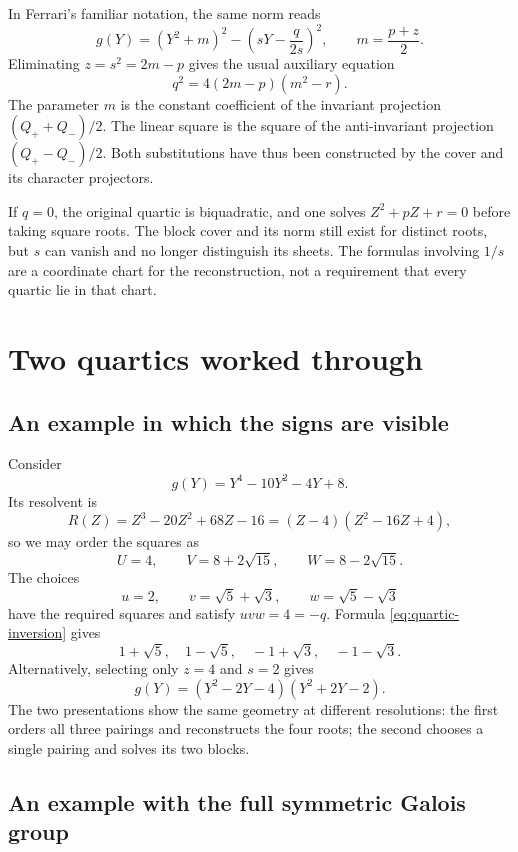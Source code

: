 \documentclass[11pt]{article}
\theoremstyle{remark}
\begin{document}
In Ferrari's familiar notation, the same norm reads
\begin{equation}
g(Y)=(Y^2+m)^2-\left(sY-\frac{q}{2s}\right)^2,
\qquad m=\frac{p+z}{2}.
\label{eq:ferrari-square}
\end{equation}
Eliminating \(z=s^2=2m-p\) gives the usual auxiliary equation
\[
q^2=4(2m-p)(m^2-r).
\]
The parameter \(m\) is the constant coefficient of the invariant projection \((Q_++Q_-)/2\). The linear square is the square of the anti-invariant projection \((Q_+-Q_-)/2\). Both substitutions have thus been constructed by the cover and its character projectors.

If \(q=0\), the original quartic is biquadratic, and one solves \(Z^2+pZ+r=0\) before taking square roots. The block cover and its norm still exist for distinct roots, but \(s\) can vanish and no longer distinguish its sheets. The formulas involving \(1/s\) are a coordinate chart for the reconstruction, not a requirement that every quartic lie in that chart.

\section{Two quartics worked through}

\subsection{An example in which the signs are visible}

Consider
\[
g(Y)=Y^4-10Y^2-4Y+8.
\]
Its resolvent is
\[
R(Z)=Z^3-20Z^2+68Z-16=(Z-4)(Z^2-16Z+4),
\]
so we may order the squares as
\[
U=4,\qquad V=8+2\sqrt{15},\qquad W=8-2\sqrt{15}.
\]
The choices
\[
u=2,\qquad v=\sqrt5+\sqrt3,\qquad w=\sqrt5-\sqrt3
\]
have the required squares and satisfy \(uvw=4=-q\). Formula \eqref{eq:quartic-inversion} gives
\[
1+\sqrt5,\quad 1-\sqrt5,\quad -1+\sqrt3,\quad -1-\sqrt3.
\]
Alternatively, selecting only \(z=4\) and \(s=2\) gives
\[
g(Y)=(Y^2-2Y-4)(Y^2+2Y-2).
\]
The two presentations show the same geometry at different resolutions: the first orders all three pairings and reconstructs the four roots; the second chooses a single pairing and solves its two blocks.

\subsection{An example with the full symmetric Galois group}
\end{document}
